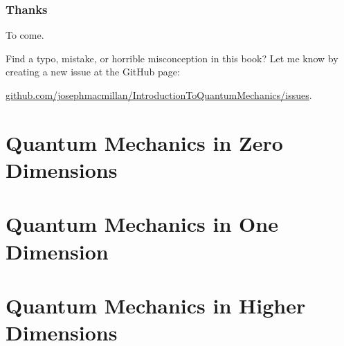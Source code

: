 \documentclass[10pt, a5paper, twoside, openany]{memoir}
\newcounter{example}[chapter]
\begin{document}
\section{Thanks}

To come.

\vspace{1in}

Find a typo, mistake, or horrible misconception in this book?  Let me know by creating a new issue at the GitHub page:  

\href{https://github.com/josephmacmillan/IntroductionToQuatumMechanics/issues}{github.com/josephmacmillan/IntroductionToQuantumMechanics/issues}.



\mainmatter

\part{Quantum Mechanics in Zero Dimensions}







\part{Quantum Mechanics in One Dimension}



\part{Quantum Mechanics in Higher Dimensions}
\end{document}
